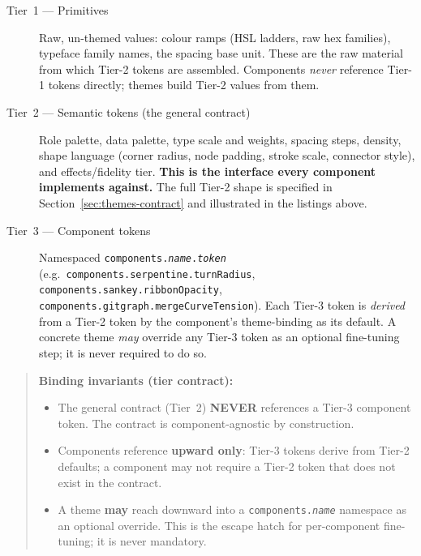\begin{description}
  \item[Tier~1 — Primitives] Raw, un-themed values: colour ramps (HSL ladders, raw hex
        families), typeface family names, the spacing base unit. These are the raw
        material from which Tier-2 tokens are assembled. Components \emph{never} reference
        Tier-1 tokens directly; themes build Tier-2 values from them.

  \item[Tier~2 — Semantic tokens (the general contract)] Role palette, data palette,
        type scale and weights, spacing steps, density, shape language (corner radius,
        node padding, stroke scale, connector style), and effects/fidelity tier.
        \textbf{This is the interface every component implements against.} The full Tier-2
        shape is specified in Section~\ref{sec:themes-contract} and illustrated in the
        listings above.

  \item[Tier~3 — Component tokens] Namespaced \texttt{components.\textit{name}.\textit{token}}
        (e.g.\ \texttt{components.serpentine.turnRadius},
        \texttt{components.sankey.ribbonOpacity},
        \texttt{components.gitgraph.mergeCurveTension}). Each Tier-3 token is
        \emph{derived} from a Tier-2 token by the component's theme-binding as its default.
        A concrete theme \emph{may} override any Tier-3 token as an optional fine-tuning
        step; it is never required to do so.
\end{description}

\begin{quote}
\textbf{Binding invariants (tier contract):}
\begin{itemize}
  \item The general contract (Tier~2) \textbf{NEVER} references a Tier-3 component token.
        The contract is component-agnostic by construction.
  \item Components reference \textbf{upward only}: Tier-3 tokens derive from Tier-2
        defaults; a component may not require a Tier-2 token that does not exist in the
        contract.
  \item A theme \textbf{may} reach downward into a \texttt{components.\textit{name}}
        namespace as an optional override. This is the escape hatch for per-component
        fine-tuning; it is never mandatory.
\end{itemize}
\end{quote}


